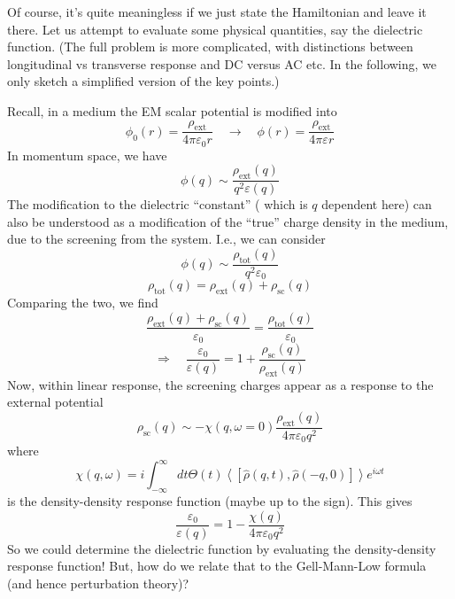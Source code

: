 Of course, it's quite meaningless if we just state the Hamiltonian and leave it there. Let us attempt to evaluate some physical quantities, say the dielectric function. (The full problem is more complicated, with distinctions between longitudinal vs transverse response and DC versus AC etc. In the following, we only sketch a simplified version of the key points.)

Recall, in a medium the EM scalar potential is modified into
\[ \phi _0\left( r \right) =\frac{\rho _{\mathrm{ext}}}{4\pi \varepsilon _0r}\quad \rightarrow \quad \phi \left( r \right) =\frac{\rho _{\mathrm{ext}}}{4\pi \varepsilon r}\]
In momentum space, we have
\[ \phi \left( q \right) \sim \frac{\rho _{\mathrm{ext}}\left( q \right)}{q^2\varepsilon \left( q \right)}\]
The modification to the dielectric ``constant'' ( which is $q$ dependent here) can also be understood as a modification of the ``true'' charge density in the medium, due to the screening from the system. I.e., we can consider
\[ \phi \left( q \right) \sim \frac{\rho _{\mathrm{tot}}\left( q \right)}{q^2\varepsilon _0}\]
\[ \rho _{\mathrm{tot}}\left( q \right) =\rho _{\mathrm{ext}}\left( q \right) +\rho _{\mathrm{sc}}\left( q \right) \]
Comparing the two, we find
\[ \frac{\rho _{\mathrm{ext}}\left( q \right) +\rho _{\mathrm{sc}}\left( q \right)}{\varepsilon _0}=\frac{\rho _{\mathrm{tot}}\left( q \right)}{\varepsilon _0}\]
\[ \Rightarrow \quad \frac{\varepsilon _0}{\varepsilon \left( q \right)}=1+\frac{\rho _{\mathrm{sc}}\left( q \right)}{\rho _{\mathrm{ext}}\left( q \right)}\]
Now, within linear response, the screening charges appear as a response to the external potential
\[ \rho _{\mathrm{sc}}\left( q \right) \sim -\chi \left( q,\omega =0 \right) \frac{\rho _{\mathrm{ext}}\left( q \right)}{4\pi \varepsilon _0q^2}\]
where
\[ \chi \left( q,\omega \right) =i\int_{-\infty}^{\infty}{dt\Theta \left( t \right) \left< \left[ \hat{\rho}\left( q,t \right) ,\hat{\rho}\left( -q,0 \right) \right] \right> e^{i\omega t}}\]
is the density-density response function (maybe up to the sign). This gives
\[ \frac{\varepsilon _0}{\varepsilon \left( q \right)}=1-\frac{\chi \left( q \right)}{4\pi \varepsilon _0q^2}\]
So we could determine the dielectric function by evaluating the density-density response function! But, how do we relate that to the Gell-Mann-Low formula (and hence perturbation theory)?
